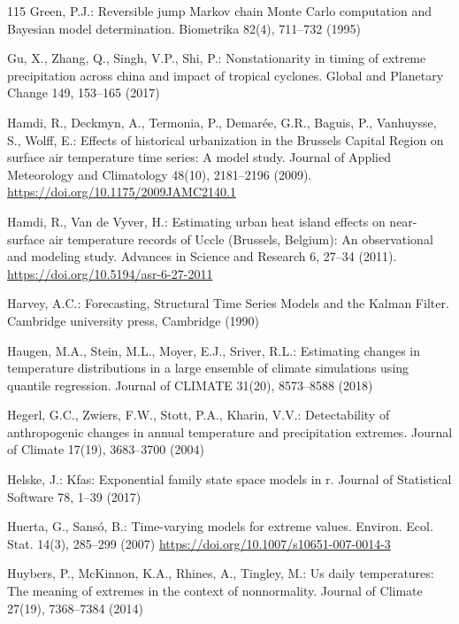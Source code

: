 \documentclass[11pt,a4paper]{article}
\begin{document}
\begin{thebibliography}{115}
		Green, P.J.: Reversible jump Markov chain Monte Carlo computation and Bayesian model determination. Biometrika 82(4), 711--732 (1995)
		
		Gu, X., Zhang, Q., Singh, V.P., Shi, P.: Nonstationarity in timing of extreme precipitation across china and impact of tropical cyclones. Global and Planetary Change 149, 153--165 (2017)
		
		Hamdi, R., Deckmyn, A., Termonia, P., Demarée, G.R., Baguis, P., Vanhuysse, S., Wolff, E.: Effects of historical urbanization in the Brussels Capital Region on surface air temperature time series: A model study. Journal of Applied Meteorology and Climatology 48(10), 2181--2196 (2009). \url{https://doi.org/10.1175/2009JAMC2140.1}
		
		Hamdi, R., Van de Vyver, H.: Estimating urban heat island effects on near-surface air temperature records of Uccle (Brussels, Belgium): An observational and modeling study. Advances in Science and Research 6, 27--34 (2011). \url{https://doi.org/10.5194/asr-6-27-2011}
		
		Harvey, A.C.: Forecasting, Structural Time Series Models and the Kalman Filter. Cambridge university press, Cambridge (1990)
		
		Haugen, M.A., Stein, M.L., Moyer, E.J., Sriver, R.L.: Estimating changes in temperature distributions in a large ensemble of climate simulations using quantile regression. Journal of CLIMATE 31(20), 8573--8588 (2018)
		
		Hegerl, G.C., Zwiers, F.W., Stott, P.A., Kharin, V.V.: Detectability of anthropogenic changes in annual temperature and precipitation extremes. Journal of Climate 17(19), 3683--3700 (2004)
		
		Helske, J.: Kfas: Exponential family state space models in r. Journal of Statistical Software 78, 1--39 (2017)
		
		Huerta, G., Sansó, B.: Time-varying models for extreme values. Environ. Ecol. Stat. 14(3), 285--299 (2007) \url{https://doi.org/10.1007/s10651-007-0014-3}
		
		Huybers, P., McKinnon, K.A., Rhines, A., Tingley, M.: Us daily temperatures: The meaning of extremes in the context of nonnormality. Journal of Climate 27(19), 7368--7384 (2014)
		

\end{thebibliography}
\end{document}
